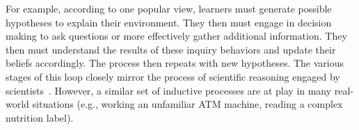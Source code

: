 \documentclass[man,floatsintext]{apa6}
\begin{document}
For example, according to one popular view, learners must generate 
possible hypotheses to explain their environment.  They then must engage in 
decision making to ask questions or more effectively gather additional information.  
They then must understand the results of these inquiry behaviors and update their 
beliefs accordingly.  The process then repeats with new hypotheses.  The various 
stages of this loop closely mirror the process of scientific reasoning engaged by 
scientists~\cite{Russell:1993,Klein:2006a,Klein:2006b}. However, a similar set of 
inductive processes are at play in many real-world situations (e.g., working an 
unfamiliar ATM machine, reading a complex nutrition label).



%
\end{document}

